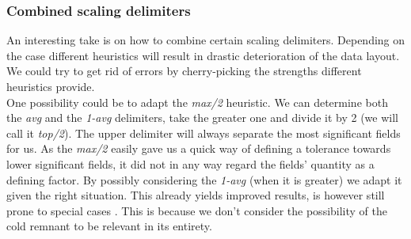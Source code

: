 \subsubsection{Combined scaling delimiters}
An interesting take is on how to combine certain scaling delimiters. Depending on the case different heuristics will result in drastic deterioration of the data layout. We could try to get rid of errors by cherry-picking the strengths different heuristics provide.\\
One possibility could be to adapt the \textit{max/2} heuristic. We can determine both the \textit{avg} and the \textit{1-avg} delimiters, take the greater one and divide it by 2 (we will call it \textit{top/2}). The upper delimiter will always separate the most significant fields for us. As the \textit{max/2} easily gave us a quick way of defining a tolerance towards lower significant fields, it did not in any way regard the fields' quantity as a defining factor. By possibly considering the \textit{1-avg} (when it is greater) we adapt it given the right situation. This already yields improved results, is however still prone to special cases . This is because we don't consider the possibility of the cold remnant to be relevant in its entirety.

